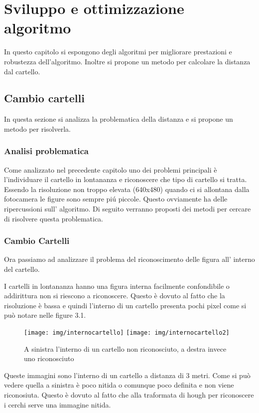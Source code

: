 \chapter{Sviluppo e ottimizzazione algoritmo}

In questo capitolo si espongono degli algoritmi per migliorare prestazioni e robustezza dell'algoritmo. Inoltre si propone un metodo per calcolare la distanza dal cartello.

\section{Cambio cartelli}

	In questa sezione si analizza la problematica della distanza e si propone un metodo per risolverla.

	\subsection{Analisi problematica}
		Come analizzato nel precedente capitolo uno dei problemi principali è l'individuare il cartello in lontananza e riconoscere che tipo di cartello si tratta.
		Essendo la risoluzione non troppo elevata (640x480) quando ci si allontana dalla fotocamera le figure sono sempre pi\'u piccole. Questo ovviamente ha delle ripercussioni sull' algoritmo.
		Di seguito verranno proposti dei metodi per cercare di risolvere questa problematica.


	\subsection{Cambio Cartelli}
		Ora passiamo ad analizzare il problema del riconoscimento delle figura all' interno del cartello.

		I cartelli in lontananza hanno una figura interna facilmente confondibile o addirittura non si riescono a riconoscere. Questo è dovuto al fatto che la risoluzione è bassa e quindi l'interno di un cartello presenta pochi pixel come si può notare nelle figure 3.1.

		\begin{figure}[!ht]
			\centering
			\texttt{[image: img/internocartello]}
			\texttt{[image: img/internocartello2]}
			\caption[Interno cartelli]{A sinistra l'interno di un cartello non riconosciuto, a destra invece uno riconosciuto}
		\end{figure}
		
		Queste immagini sono l'interno di un cartello a distanza di 3 metri. Come si può vedere quella a sinistra è poco nitida o comunque poco definita e non viene riconosiuta. Questo è dovuto al fatto che alla traformata di hough per riconoscere i cerchi serve una immagine nitida.


